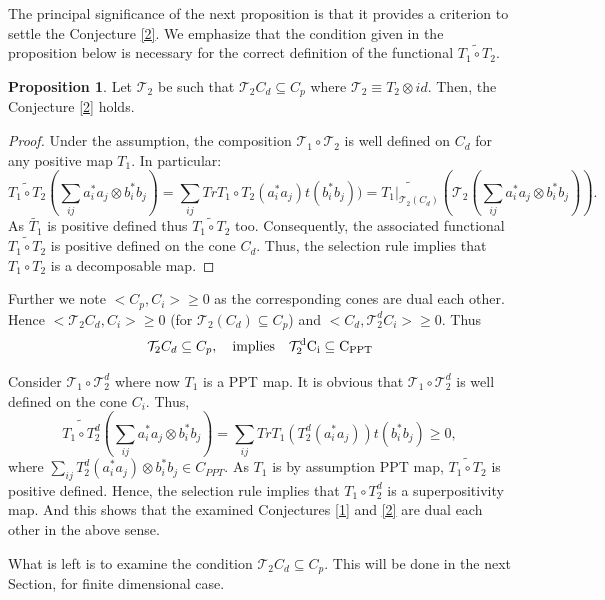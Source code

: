 \documentclass{amsart}
\theoremstyle{plain}
\theoremstyle{definition}
\newtheorem{prop}[thm]{Proposition}
\newcommand{\cT}{\mathcal{T}}
\begin{document}
The principal significance of the next proposition is that it provides a criterion to settle the Conjecture \ref{2}. We emphasize that the condition given in the proposition below is necessary for the correct definition of the functional $\widetilde{T_1 \circ T_2}$.

\begin{prop}
\label{3.4}
Let $\cT_2$  be such that $\cT_2 C_d \subseteq C_p$ where $\cT_2 \equiv T_2 \otimes id$. Then, the Conjecture \ref{2} holds.
\end{prop}
\begin{proof}
Under the assumption, the composition $\cT_1 \circ \cT_2$ is well  defined on $C_d$ for any positive map $T_1$. 
In particular:
\begin{equation}
\widetilde{T_1 \circ T_2}(\sum_{ij} a^*_i a_j \otimes b^*_i b_j) = \sum_{ij} Tr T_1 \circ T_2 (a^*_i a_j) t(b^*_ib_j)) = \widetilde{T_1|_{\cT_2(C_d)}}(\cT_2(
\sum_{ij}a^*_i a_j \otimes b^*_i b_j)).
\end{equation}
As $\widetilde{T_1}$ is positive defined thus $\widetilde{T_1 \circ T_2}$ too.
Consequently,  the associated functional $\widetilde{T_1 \circ T_2}$ is positive defined on the cone $C_d$. Thus, the selection rule implies that $T_1 \circ T_2$ is a decomposable map.
\end{proof}




Further we note  $<C_p, C_i> \geq0$ as the corresponding cones are dual each other. Hence $<\cT_2 C_d, C_i> \geq0$ 
(for $\cT_2(C_d) \subseteq C_p$) and $<C_d, \cT_2^d C_i> \geq0$. Thus
\begin{equation}
\label{*}
\cT_2 C_d \subseteq C_p, \quad \rm{ implies} \quad  \cT^d_2 C_i \subseteq C_{PPT}
\end{equation}

Consider $\cT_1 \circ \cT^d_2$ where now $T_1$ is a PPT map. It is obvious that $\cT_1 \circ \cT^d_2$ is well defined on the cone $C_i$.
Thus, 
$$\widetilde{T_1 \circ T^d_2}(\sum_{ij} a^*_ia_j \otimes b^*_ib_j) = \sum_{ij} Tr T_1(T^d_2(a^*_ia_j))t(b^*_ib_j)\geq 0,$$
where $\sum_{ij} T^d_2(a^*_ia_j) \otimes b^*_ib_j \in C_{PPT}$.
As $T_1$ is by assumption PPT map, $\widetilde{T_1 \circ T_2}$  is positive defined.
Hence,  the selection rule implies that $T_1 \circ T^d_2$
is a superpositivity map. And this shows that the examined Conjectures  \ref{1} and  \ref{2}  are dual each other in the above sense.

What is left is to examine  the condition  $\cT_2C_d \subseteq C_p$. This will be done in the next Section, for finite dimensional case. 
\end{document}
